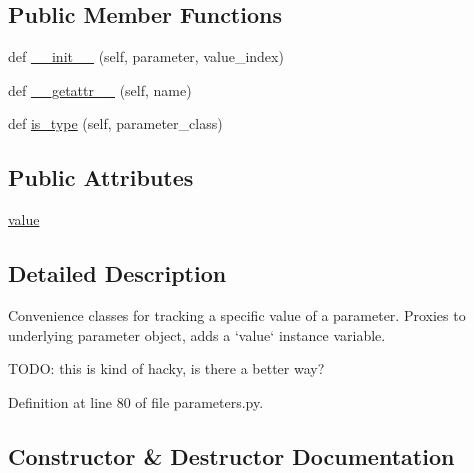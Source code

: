 \subsection*{Public Member Functions}
\begin{DoxyCompactItemize}
\item 
def \hyperlink{classcodar_1_1cheetah_1_1parameters_1_1_parameter_value_ae19c1175ff199c5405518564ec81fa56}{\+\_\+\+\_\+init\+\_\+\+\_\+} (self, parameter, value\+\_\+index)
\item 
def \hyperlink{classcodar_1_1cheetah_1_1parameters_1_1_parameter_value_a984544b6535a16032e725c503f9cba38}{\+\_\+\+\_\+getattr\+\_\+\+\_\+} (self, name)
\item 
def \hyperlink{classcodar_1_1cheetah_1_1parameters_1_1_parameter_value_aad9f920a002859ecec18f5f1ef6085e0}{is\+\_\+type} (self, parameter\+\_\+class)
\end{DoxyCompactItemize}
\subsection*{Public Attributes}
\begin{DoxyCompactItemize}
\item 
\hyperlink{classcodar_1_1cheetah_1_1parameters_1_1_parameter_value_a270382b19fffc9efa6dd17119b8e1ba8}{value}
\end{DoxyCompactItemize}


\subsection{Detailed Description}
\begin{DoxyVerb}Convenience classes for tracking a specific value of a parameter.
Proxies to underlying parameter object, adds a `value` instance
variable.

TODO: this is kind of hacky, is there a better way?
\end{DoxyVerb}
 

Definition at line 80 of file parameters.\+py.



\subsection{Constructor \& Destructor Documentation}
\mbox{\label{classcodar_1_1cheetah_1_1parameters_1_1_parameter_value_ae19c1175ff199c5405518564ec81fa56}} 

